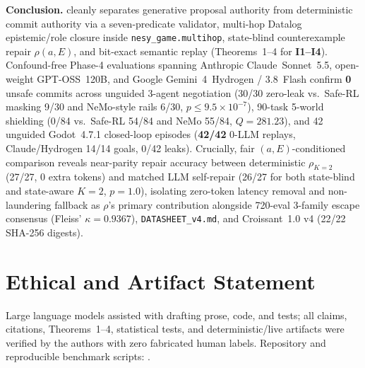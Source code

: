 \textbf{Conclusion.} \system{} cleanly separates generative proposal authority from deterministic commit authority via a seven-predicate validator, multi-hop Datalog epistemic/role closure inside \texttt{nesy\_game.multihop}, state-blind counterexample repair $\rho(a,E)$, and bit-exact semantic replay (Theorems~1--4 for \textbf{I1--I4}). Confound-free Phase-4 evaluations spanning Anthropic Claude~Sonnet~5.5, open-weight GPT-OSS~120B, and Google Gemini~4~Hydrogen / 3.8~Flash confirm \textbf{0} unsafe commits across unguided 3-agent negotiation (30/30 zero-leak vs.\ Safe-RL masking 9/30 and NeMo-style rails 6/30, $p{\le}9.5{\times}10^{-7}$), 90-task 5-world shielding (0/84 vs.\ Safe-RL 54/84 and NeMo 55/84, $Q{=}281.23$), and 42 unguided Godot~4.7.1 closed-loop episodes (\textbf{42/42} 0-LLM replays, Claude/Hydrogen 14/14 goals, 0/42 leaks). Crucially, fair $(a,E)$-conditioned comparison reveals near-parity repair accuracy between deterministic $\rho_{K=2}$ (27/27, 0 extra tokens) and matched LLM self-repair (26/27 for both state-blind and state-aware $K{=}2$, $p{=}1.0$), isolating zero-token latency removal and non-laundering fallback as $\rho$'s primary contribution alongside 720-eval 3-family escape consensus (Fleiss' $\kappa{=}0.9367$), \texttt{DATASHEET\_v4.md}, and Croissant~1.0 v4 (22/22 SHA-256 digests).

\section*{Ethical and Artifact Statement}
Large language models assisted with drafting prose, code, and tests; all claims, citations, Theorems~1--4, statistical tests, and deterministic/live artifacts were verified by the authors with zero fabricated human labels. Repository and reproducible benchmark scripts: \RepoURL.